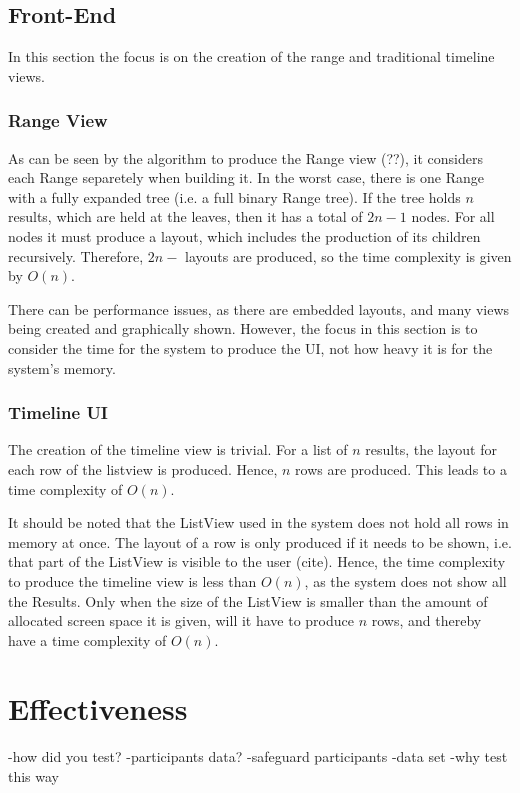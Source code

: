 \subsection{Front-End}
\par In this section the focus is on the creation of the range and traditional timeline views.
\subsubsection{Range View}
\par As can be seen by the algorithm to produce the Range view (??), it considers each Range separetely when building it. In the worst case, there is one Range with a fully expanded tree (i.e. a full binary Range tree). If the tree holds $n$ results, which are held at the leaves, then it has a total of $2n-1$ nodes. For all nodes it must produce a layout, which includes the production of its children recursively. Therefore, $2n-$ layouts are produced, so the time complexity is given by $O(n)$. 
\par There can be performance issues, as there are embedded layouts, and many views being created and graphically shown. However, the focus in this section is to consider the time for the system to produce the UI, not how heavy it is for the system's memory.
\subsubsection{Timeline UI}
\par The creation of the timeline view is trivial. For a list of $n$ results, the layout for each row of the listview is produced. Hence, $n$ rows are produced. This leads to a time complexity of $O(n)$.
\par It should be noted that the ListView used in the system does not hold all rows in memory at once. The layout of a row is only produced if it needs to be shown, i.e. that part of the ListView is visible to the user (cite). Hence, the time complexity to produce the timeline view is less than $O(n)$, as the system does not show all the Results. Only when the size of the ListView is smaller than the amount of allocated screen space it is given, will it have to produce $n$ rows, and thereby have a time complexity of $O(n)$.
\section{Effectiveness}
-how did you test?
-participants data?
-safeguard participants
-data set
-why test this way